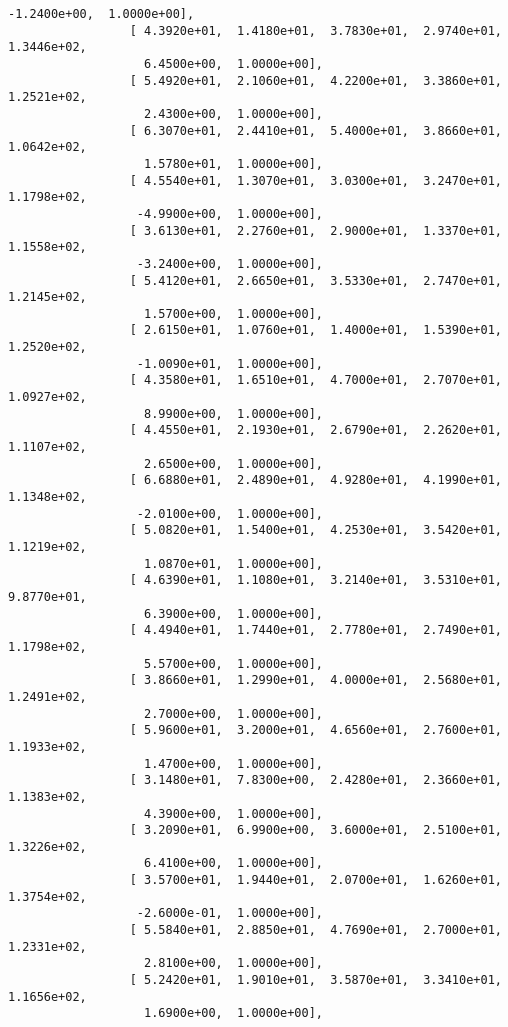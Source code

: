 \documentclass[11pt]{article}
\begin{document}
\begin{Verbatim}[commandchars=\\\{\}]
                  -1.2400e+00,  1.0000e+00],
                 [ 4.3920e+01,  1.4180e+01,  3.7830e+01,  2.9740e+01,  1.3446e+02,
                   6.4500e+00,  1.0000e+00],
                 [ 5.4920e+01,  2.1060e+01,  4.2200e+01,  3.3860e+01,  1.2521e+02,
                   2.4300e+00,  1.0000e+00],
                 [ 6.3070e+01,  2.4410e+01,  5.4000e+01,  3.8660e+01,  1.0642e+02,
                   1.5780e+01,  1.0000e+00],
                 [ 4.5540e+01,  1.3070e+01,  3.0300e+01,  3.2470e+01,  1.1798e+02,
                  -4.9900e+00,  1.0000e+00],
                 [ 3.6130e+01,  2.2760e+01,  2.9000e+01,  1.3370e+01,  1.1558e+02,
                  -3.2400e+00,  1.0000e+00],
                 [ 5.4120e+01,  2.6650e+01,  3.5330e+01,  2.7470e+01,  1.2145e+02,
                   1.5700e+00,  1.0000e+00],
                 [ 2.6150e+01,  1.0760e+01,  1.4000e+01,  1.5390e+01,  1.2520e+02,
                  -1.0090e+01,  1.0000e+00],
                 [ 4.3580e+01,  1.6510e+01,  4.7000e+01,  2.7070e+01,  1.0927e+02,
                   8.9900e+00,  1.0000e+00],
                 [ 4.4550e+01,  2.1930e+01,  2.6790e+01,  2.2620e+01,  1.1107e+02,
                   2.6500e+00,  1.0000e+00],
                 [ 6.6880e+01,  2.4890e+01,  4.9280e+01,  4.1990e+01,  1.1348e+02,
                  -2.0100e+00,  1.0000e+00],
                 [ 5.0820e+01,  1.5400e+01,  4.2530e+01,  3.5420e+01,  1.1219e+02,
                   1.0870e+01,  1.0000e+00],
                 [ 4.6390e+01,  1.1080e+01,  3.2140e+01,  3.5310e+01,  9.8770e+01,
                   6.3900e+00,  1.0000e+00],
                 [ 4.4940e+01,  1.7440e+01,  2.7780e+01,  2.7490e+01,  1.1798e+02,
                   5.5700e+00,  1.0000e+00],
                 [ 3.8660e+01,  1.2990e+01,  4.0000e+01,  2.5680e+01,  1.2491e+02,
                   2.7000e+00,  1.0000e+00],
                 [ 5.9600e+01,  3.2000e+01,  4.6560e+01,  2.7600e+01,  1.1933e+02,
                   1.4700e+00,  1.0000e+00],
                 [ 3.1480e+01,  7.8300e+00,  2.4280e+01,  2.3660e+01,  1.1383e+02,
                   4.3900e+00,  1.0000e+00],
                 [ 3.2090e+01,  6.9900e+00,  3.6000e+01,  2.5100e+01,  1.3226e+02,
                   6.4100e+00,  1.0000e+00],
                 [ 3.5700e+01,  1.9440e+01,  2.0700e+01,  1.6260e+01,  1.3754e+02,
                  -2.6000e-01,  1.0000e+00],
                 [ 5.5840e+01,  2.8850e+01,  4.7690e+01,  2.7000e+01,  1.2331e+02,
                   2.8100e+00,  1.0000e+00],
                 [ 5.2420e+01,  1.9010e+01,  3.5870e+01,  3.3410e+01,  1.1656e+02,
                   1.6900e+00,  1.0000e+00],

\end{Verbatim}
\end{document}

